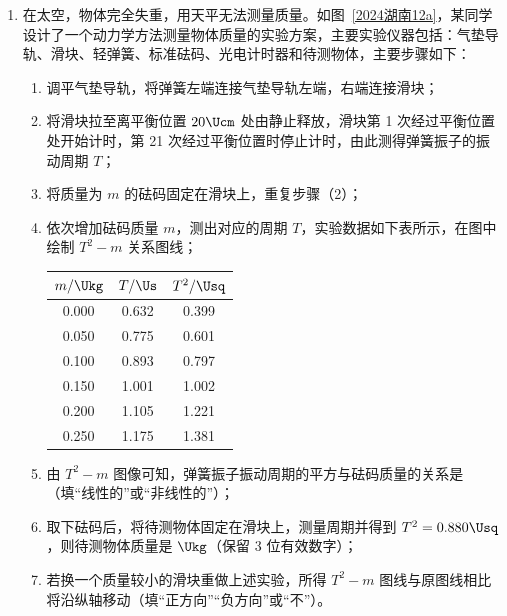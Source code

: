 \documentclass[\gkver]{gaokaozhenti}
\begin{document}
\begin{enumerate}
\item
在太空，物体完全失重，用天平无法测量质量。如图~\ref{2024湖南12a}，某同学设计了一个动力学方法测量物体质量的实验方案，主要实验仪器包括：气垫导轨、滑块、轻弹簧、标准砝码、光电计时器和待测物体，主要步骤如下：
\begin{enumerate}
	\item
	调平气垫导轨，将弹簧左端连接气垫导轨左端，右端连接滑块；
	\item
	将滑块拉至离平衡位置 $20 \Ucm$ 处由静止释放，滑块第 1 次经过平衡位置处开始计时，第 21 次经过平衡位置时停止计时，由此测得弹簧振子的振动周期 $T$；
	\item
	将质量为 $m$ 的砝码固定在滑块上，重复步骤（2）；
	\item
	依次增加砝码质量 $m$，测出对应的周期 $T$，实验数据如下表所示，在图中绘制 $T^{2} - m$ 关系图线\tkanswer[1.5cm]{}；
	\begin{center}
	\begin{tabular}{|c|c|c|}
	\hline
	$m/\Ukg$ & $T/\Us$ & $T^{2}/\Usq$ \\ \hline
	0.000 & 0.632 & 0.399 \\ \hline
	0.050 & 0.775 & 0.601 \\ \hline
	0.100 & 0.893 & 0.797 \\ \hline
	0.150 & 1.001 & 1.002 \\ \hline
	0.200 & 1.105 & 1.221 \\ \hline
	0.250 & 1.175 & 1.381 \\ \hline
	\end{tabular}
	\end{center}
	\item
	由 $T^{2} - m$ 图像可知，弹簧振子振动周期的平方与砝码质量的关系是（填“线性的”或“非线性的”）；
	\item
	取下砝码后，将待测物体固定在滑块上，测量周期并得到 $T^{2} = 0.880 \Usq$，则待测物体质量是 $\Ukg$（保留 3 位有效数字）；
	\item
	若换一个质量较小的滑块重做上述实验，所得 $T^{2} - m$ 图线与原图线相比将沿纵轴移动（填“正方向”“负方向”或“不”）。
\end{enumerate}

\end{enumerate}
\end{document}
